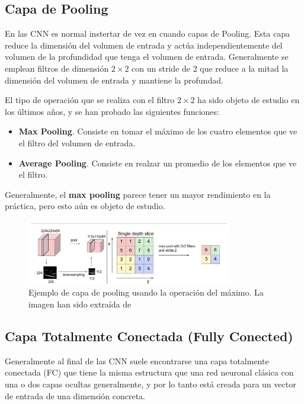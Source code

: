         \subsection{Capa de Pooling}
            \noindent En las CNN es normal instertar de vez en cuando capas de Pooling. Esta capa reduce la dimensión del volumen de entrada y actúa independientemente del volumen de la profundidad que tenga el volumen de entrada. Generalmente se emplean filtros de dimensión $2 \times 2$ con un stride de $2$ que reduce a la mitad la dimensión del volumen de entrada y mantiene la profundad.

            \medskip

            \noindent El tipo de operación que se realiza con el filtro $2 \times 2$ ha sido objeto de estudio en los últimos años, y se han probado las siguientes funciones: 

            \begin{itemize}
                \item \textbf{Max Pooling}. Consiste en tomar el máximo de los cuatro elementos que ve el filtro del volumen de entrada. 
                \item \textbf{Average Pooling}. Consiste en realzar un promedio de los elementos que ve el filtro.
            \end{itemize}

            \noindent Generalmente, el \textbf{max pooling} parece tener un mayor rendimiento en la práctica, pero esto aún es objeto de estudio.

            \begin{figure}[!h]
                \centering
                \includegraphics[width=0.8\textwidth]{img/pooling.png}
                \caption{Ejemplo de capa de pooling usando la operación del máximo. La imagen han sido extraída de \cite{StanfordCourse}}
                \label{fig:pooling}
            \end{figure}
        
        \subsection{Capa Totalmente Conectada (Fully Conected)}
            \noindent Generalmente al final de las CNN suele encontrarse una capa totalmente conectada (FC) que tiene la misma estructura que una red neuronal clásica con una o dos capas ocultas generalmente, y por lo tanto está creada para un vector de entrada de una dimensión concreta.

